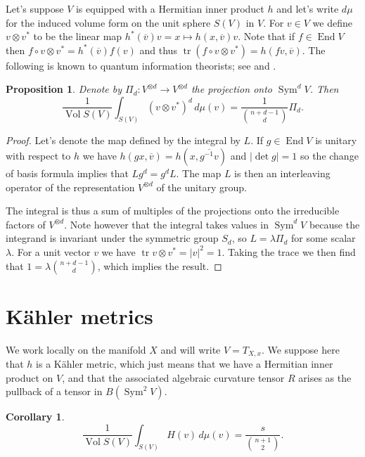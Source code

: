 \documentclass[10pt,a4paper]{amsart}
\newtheorem{prop}[theo]{Proposition}
\newtheorem{coro}[theo]{Corollary}
\theoremstyle{definition}
\def\ov#1{\overline{#1}}
\def\d{\,d}
\DeclareMathOperator{\Sym}{Sym}
\DeclareMathOperator{\tr}{tr}
\DeclareMathOperator{\Vol}{Vol}
\DeclareMathOperator{\End}{End}
\begin{document}
Let's suppose $V$ is equipped with a Hermitian inner product $h$
and let's write $d\mu$ for the induced volume form on the unit sphere $S(V)$ in
$V$. For $v \in V$ we define $v \otimes v^*$ to be the linear map
$h^*(\ov v) v = x \mapsto h(x, \ov v) v$.
Note that if $f \in \End V$ then $f \circ v \otimes v^* = h^*(\ov v) f(v)$
and thus $\tr(f \circ v \otimes v^*) = h(fv, \ov v)$.
The following is known to quantum information theorists; see
\cite{harrow2013church}
and
\cite[Chapter~7]{watrous2018theory}.

\begin{prop}
\label{prop:projection}
Denote by $\Pi_d : V^{\otimes d} \to V^{\otimes d}$ the projection onto $\Sym^d V$.
Then
$$
\frac{1}{\Vol S(V)}
\int_{S(V)} (v \otimes v^*)^{d} \d\mu(v)
= \frac{1}{\binom{n+d-1}{d}} \Pi_d.
$$
\end{prop}

\begin{proof}
Let's denote the map defined by the integral by $L$. If $g \in \End V$ is
unitary with respect to $h$ we have $h(g x, \ov v) = h(x, \ov{g^{-1} v})$ and
$|\!\det g| = 1$ so the change of basis formula implies that $L g^d = g^d L$.
The map $L$ is then an interleaving operator of the representation $V^{\otimes d}$
of the unitary group.

The integral is thus a sum of multiples of the projections onto the irreducible
factors of $V^{\otimes d}$.
Note however that the integral takes values in $\Sym^d V$ because the integrand
is invariant under the symmetric group $S_d$, so $L = \lambda \Pi_d$ for some
scalar $\lambda$. For a unit vector $v$ we have $\tr v \otimes v^* = |v|^2 =
1$.
Taking the trace we then find that $1 = \lambda \binom{n+d-1}{d}$,
which implies the result.
\end{proof}


\section{K\"ahler metrics}

We work locally on the manifold $X$ and will write $V = T_{X,x}$.
We suppose here that $h$ is a K\"ahler metric, which just means that we have a
Hermitian inner product on $V$, and that the associated algebraic curvature
tensor $R$ arises as the pullback of a tensor in $B(\Sym^2 V)$.

\begin{coro}
$$
\frac{1}{\Vol S(V)} \int_{S(V)}
\!\!\!
H(v)  \d\mu(v)
= \frac{s}{\binom{n+1}{2}}.
$$
\end{coro}
\end{document}
